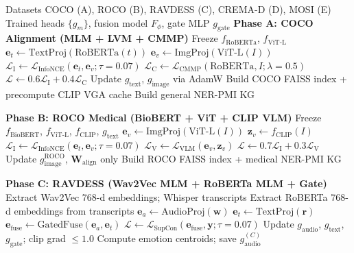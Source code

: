 \documentclass[10pt,conference]{IEEEtran}
\theoremstyle{ieeethm}
\theoremstyle{ieeedef}
\theoremstyle{ieeeremark}
\begin{document}
\begin{algorithm}[!t]
\caption{MIVA-KNIGHT$^+$ Multi-Pipeline Training}
\label{alg:training}
\begin{algorithmic}[1]
\Require Datasets COCO (A), ROCO (B), RAVDESS (C), CREMA-D (D), MOSI (E)
\Ensure Trained heads $\{g_m\}$, fusion model $F_\phi$, gate MLP $g_\text{gate}$
\Statex \textbf{Phase A: COCO Alignment (MLM + LVM + CMMP)}
\State Freeze $f_\text{RoBERTa}$, $f_\text{ViT-L}$
    \State $\mathbf{e}_t \gets \text{TextProj}(\text{RoBERTa}(t))$
    \State $\mathbf{e}_v \gets \text{ImgProj}(\text{ViT-L}(I))$
    \State $\mathcal{L}_\text{I} \gets \mathcal{L}_\text{InfoNCE}(\mathbf{e}_t, \mathbf{e}_v;\tau{=}0.07)$
    \State $\mathcal{L}_\text{C} \gets \mathcal{L}_\text{CMMP}(\text{RoBERTa},I;\lambda{=}0.5)$
    \State $\mathcal{L} \gets 0.6\mathcal{L}_\text{I} + 0.4\mathcal{L}_\text{C}$
    \State Update $g_\text{text}$, $g_\text{image}$ via AdamW
  \EndFor
\EndFor
\State Build COCO FAISS index + precompute CLIP VGA cache
\State Build general NER-PMI KG

\Statex \textbf{Phase B: ROCO Medical (BioBERT + ViT + CLIP VLM)}
\State Freeze $f_\text{BioBERT}$, $f_\text{ViT-L}$, $f_\text{CLIP}$, $g_\text{text}$
    \State $\mathbf{e}_v \gets \text{ImgProj}(\text{ViT-L}(I))$
    \State $\mathbf{z}_v \gets f_\text{CLIP}(I)$ 
    \State $\mathcal{L}_\text{I} \gets \mathcal{L}_\text{InfoNCE}(\mathbf{e}_t, \mathbf{e}_v;\tau{=}0.07)$
    \State $\mathcal{L}_\text{V} \gets \mathcal{L}_\text{VLM}(\mathbf{e}_v, \mathbf{z}_v)$ 
    \State $\mathcal{L} \gets 0.7\mathcal{L}_\text{I} + 0.3\mathcal{L}_\text{V}$
    \State Update $g_\text{image}^\text{ROCO}$, $\mathbf{W}_\text{align}$ only
  \EndFor
\EndFor
\State Build ROCO FAISS index + medical NER-PMI KG

\Statex \textbf{Phase C: RAVDESS (Wav2Vec MLM + RoBERTa MLM + Gate)}
\State Extract Wav2Vec 768-d embeddings; Whisper transcripts
\State Extract RoBERTa 768-d embeddings from transcripts
    \State $\mathbf{e}_a \gets \text{AudioProj}(\mathbf{w})$
    \State $\mathbf{e}_t \gets \text{TextProj}(\mathbf{r})$
    \State $\mathbf{e}_\text{fuse} \gets \text{GatedFuse}(\mathbf{e}_a, \mathbf{e}_t)$ 
    \State $\mathcal{L} \gets \mathcal{L}_\text{SupCon}(\mathbf{e}_\text{fuse}, \mathbf{y};\tau{=}0.07)$
    \State Update $g_\text{audio}$, $g_\text{text}$, $g_\text{gate}$; clip grad $\leq 1.0$
  \EndFor
\EndFor
\State Compute emotion centroids; save $g_\text{audio}^{(C)}$


\end{algorithmic}
\end{algorithm}
\end{document}

